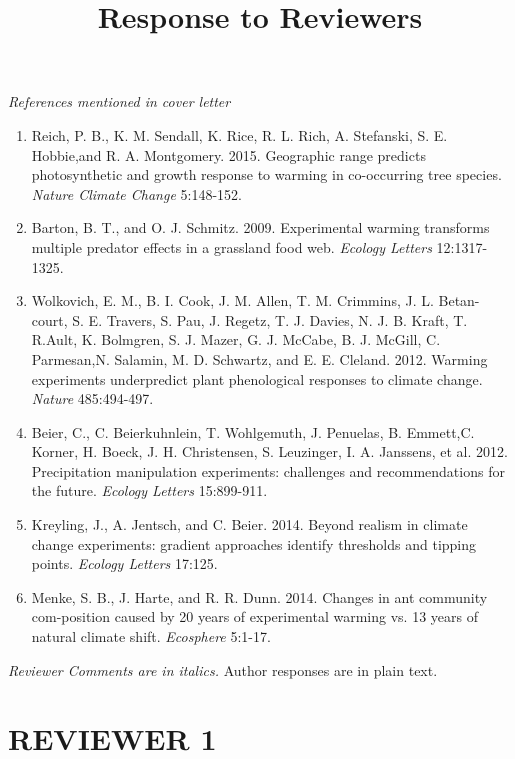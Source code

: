 \documentclass[11pt,a4paper]{letter}
\begin{document}
\begin{letter}{}
\noindent \emph{References mentioned in cover letter}
\begin{footnotesize}
\begin{enumerate}
\item Reich,  P. B.,  K. M. Sendall,  K. Rice,  R. L. Rich,  A. Stefanski,  S. E. Hobbie,and R. A. Montgomery. 2015.  Geographic range predicts photosynthetic and growth response to warming in co-occurring tree species.  \emph{Nature Climate Change} 5:148-152.
\item Barton,  B.  T.,  and  O.  J.  Schmitz.  2009.   Experimental  warming  transforms multiple predator effects in a grassland food web.   \emph{Ecology Letters} 12:1317-1325.
\item Wolkovich,  E.  M.,  B.  I.  Cook,  J.  M.  Allen,  T.  M.  Crimmins,  J.  L.  Betan-court, S. E. Travers, S. Pau, J. Regetz, T. J. Davies, N. J. B. Kraft, T. R.Ault, K. Bolmgren, S. J. Mazer, G. J. McCabe, B. J. McGill, C. Parmesan,N. Salamin, M. D. Schwartz, and E. E. Cleland. 2012.  Warming experiments underpredict plant phenological responses to climate change.  \emph{Nature} 485:494-497.
\item Beier,   C.,   C.   Beierkuhnlein,   T.   Wohlgemuth,   J.   Penuelas,   B.   Emmett,C. Korner, H. Boeck, J. H. Christensen, S. Leuzinger, I. A. Janssens, et al. 2012.  Precipitation manipulation experiments: challenges and recommendations for the future.  \emph{Ecology Letters} 15:899-911.
\item Kreyling, J., A. Jentsch, and C. Beier. 2014.  Beyond realism in climate change experiments: gradient  approaches  identify  thresholds  and  tipping  points. \emph{Ecology Letters} 17:125.
\item Menke, S. B., J. Harte, and R. R. Dunn. 2014. Changes in ant community com-position caused by 20 years of experimental warming vs. 13 years of natural climate shift.  \emph{Ecosphere} 5:1-17.

\end{enumerate}
\end{footnotesize}

\clearpage
\title{Response to Reviewers}
 \emph{Reviewer Comments are in italics.} Author responses are in plain text.

\section {REVIEWER 1}


\end{letter}
\end{document}
